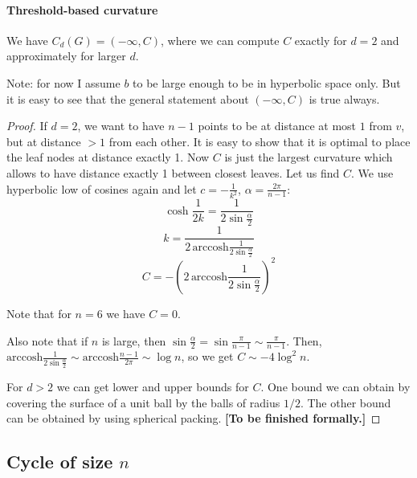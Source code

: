 \documentclass{article}
\begin{document}
\paragraph{Threshold-based curvature}

We have $C_d(G) = (-\infty, C)$, where we can compute $C$ exactly for $d = 2$ and approximately for larger $d$. 

Note: for now I assume $b$ to be large enough to be in hyperbolic space only. But it is easy to see that the general statement about $(-\infty, C)$ is true always.

\begin{proof}

If $d = 2$, we want to have $n-1$ points to be at distance at most $1$ from $v$, but at distance $> 1$ from each other. It is easy to show that it is optimal to place the leaf nodes at distance exactly 1. Now $C$ is just the largest curvature which allows to have distance exactly 1 between closest leaves. Let us find $C$. We use hyperbolic low of cosines again and let $c = -\frac{1}{k^2}$, $\alpha = \frac{2\pi}{n-1}$:
\[
\cosh\frac{1}{2k} = \frac{1}{2\sin \frac{\alpha}{2}}
\]
\[
k = \frac{1}{2\,\textrm{arccosh}\frac{1}{2\sin \frac{\alpha}{2}}}
\]
\[
C = - \left(2\,\textrm{arccosh}\frac{1}{2\sin \frac{\alpha}{2}}\right)^2
\]

Note that for $n = 6$ we have $C = 0$.

Also note that if $n$ is large, then $\sin \frac{\alpha}{2} = \sin\frac{\pi}{n-1} \sim \frac{\pi}{n-1}$. Then,  $\textrm{arccosh}\frac{1}{2\sin \frac{\alpha}{2}} \sim \textrm{arccosh}\frac{n-1}{2\pi} \sim \log n$, so we get $C \sim - 4 \log^2 n$. 

For $d > 2$ we can get lower and upper bounds for $C$. One bound we can obtain by covering the surface of a unit ball by the balls of radius $1/2$. The other bound can be obtained by using spherical packing. \textbf{[To be finished formally.]} 

\end{proof}


\subsection{Cycle of size $n$}
                     
\end{document}
